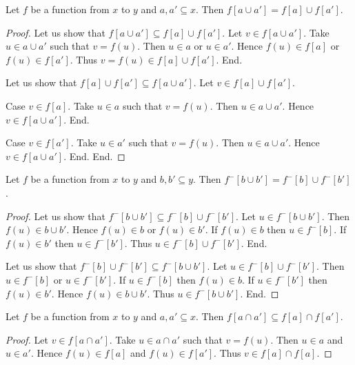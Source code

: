 \documentclass[../../sets-and-functions.ftl.tex]{subfiles}
\begin{document}
\begin{forthel}
    \begin{proposition}[SF 02 02 319894]
      Let $f$ be a function from $x$ to $y$ and $a,a' \subseteq x$.
      Then $f[a \cup a'] = f[a] \cup f[a']$.
    \end{proposition}
    \begin{proof}
      Let us show that $f[a \cup a'] \subseteq f[a] \cup f[a']$.
        Let $v \in f[a \cup a']$.
        Take $u \in a \cup a'$ such that $v = f(u)$.
        Then $u \in a$ or $u \in a'$.
        Hence $f(u) \in f[a]$ or $f(u) \in f[a']$.
        Thus $v = f(u) \in f[a] \cup f[a']$.
      End.

      Let us show that $f[a] \cup f[a'] \subseteq f[a \cup a']$.
        Let $v \in f[a] \cup f[a']$.

        Case $v \in f[a]$.
          Take $u \in a$ such that $v = f(u)$.
          Then $u \in a \cup a'$.
          Hence $v \in f[a \cup a']$.
        End.

        Case $v \in f[a']$.
          Take $u \in a'$ such that $v = f(u)$.
          Then $u \in a \cup a'$.
          Hence $v \in f[a \cup a']$.
        End.
      End.
    \end{proof}

    \begin{proposition}[SF 02 02 357044]
      Let $f$ be a function from $x$ to $y$ and $b,b' \subseteq y$.
      Then $f^{-}[b \cup b'] = f^{-}[b] \cup f^{-}[b']$.
    \end{proposition}
    \begin{proof}
      Let us show that $f^{-}[b \cup b'] \subseteq f^{-}[b] \cup f^{-}[b']$.
        Let $u \in f^{-}[b \cup b']$.
        Then $f(u) \in b \cup b'$.
        Hence $f(u) \in b$ or $f(u) \in b'$.
        If $f(u) \in b$ then $u \in f^{-}[b]$.
        If $f(u) \in b'$ then $u \in f^{-}[b']$.
        Thus $u \in f^{-}[b] \cup f^{-}[b']$.
      End.

      Let us show that $f^{-}[b] \cup f^{-}[b'] \subseteq f^{-}[b \cup b']$.
        Let $u \in f^{-}[b] \cup f^{-}[b']$.
        Then $u \in f^{-}[b]$ or $u \in f^{-}[b']$.
        If $u \in f^{-}[b]$ then $f(u) \in b$.
        If $u \in f^{-}[b']$ then $f(u) \in b'$.
        Hence $f(u) \in b \cup b'$.
        Thus $u \in f^{-}[b \cup b']$.
      End.
    \end{proof}

    \begin{proposition}[SF 02 02 512404]
      Let $f$ be a function from $x$ to $y$ and $a,a' \subseteq x$.
      Then $f[a \cap a'] \subseteq f[a] \cap f[a']$.
    \end{proposition}
    \begin{proof}
      Let $v \in f[a \cap a']$.
      Take $u \in a \cap a'$ such that $v = f(u)$.
      Then $u \in a$ and $u \in a'$.
      Hence $f(u) \in f[a]$ and $f(u) \in f[a']$.
      Thus $v \in f[a] \cap f[a]$.
    \end{proof}


\end{forthel}
\end{document}
